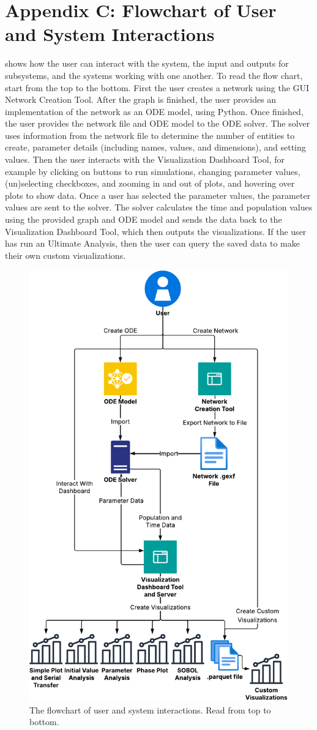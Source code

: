 \chapter{Appendix C: Flowchart of User and System Interactions}
\label{AppendixC}

 shows how the user can interact with the system, the input and outputs for subsystems, and the systems working with one another. 
    To read the flow chart, start from the top to the bottom. 
    First the user creates a network using the GUI Network Creation Tool. 
    After the graph is finished, the user provides an implementation of the network as an ODE model, using Python. 
    Once finished, the user provides the network file and ODE model to the ODE solver. 
    The solver uses information from the network file to determine the number of entities to create, parameter details (including names, values, and dimensions), and setting values.
    Then the user interacts with the Visualization Dashboard Tool, for example by clicking on buttons to run simulations, changing parameter values, (un)selecting checkboxes, and zooming in and out of plots, and hovering over plots to show data. 
    Once a user has selected the parameter values, the parameter values are sent to the solver. 
    The solver calculates the time and population values using the provided graph and ODE model and sends the data back to the Visualization Dashboard Tool, which then outputs the visualizations. 
    If the user has run an Ultimate Analysis, then the user can query the saved data to make their own custom visualizations.
\begin{figure}
    \centering
    \includegraphics[width=0.8\linewidth]{Images/interaction_diagram.pdf}
    \captionsetup{width=1\linewidth}
    \caption{
        The flowchart of user and system interactions. Read from top to bottom. 
    }
    \label{fig:interaction_diagram}
\end{figure} 